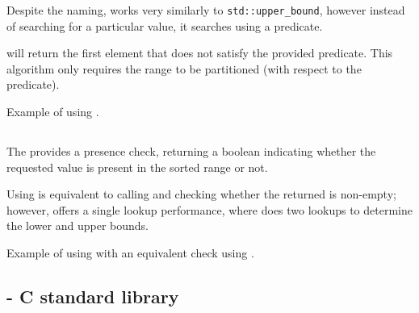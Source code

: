 Despite the naming,  works very similarly to \texttt{std::upper\-\_bound}, however instead of searching for a particular value, it searches using a predicate.


 will return the first element that does not satisfy the provided predicate. This algorithm only requires the range to be partitioned (with respect to the predicate).

\begin{box-note}
\footnotesize Example of using .
\tcblower
{}
\end{box-note}

\subsection{\texorpdfstring{}{\texttt{std::binary\_search}}}

The  provides a presence check, returning a boolean indicating whether the requested value is present in the sorted range or not.


Using  is equivalent to calling  and checking whether the returned is non-empty; however,  offers a single lookup performance, where  does two lookups to determine the lower and upper bounds.

\begin{box-note}
\footnotesize Example of using  with an equivalent check using .
\tcblower
{}
\end{box-note}

\subsection{\texorpdfstring{ - C standard library}{\texttt{bsearch} - C standard library}}


